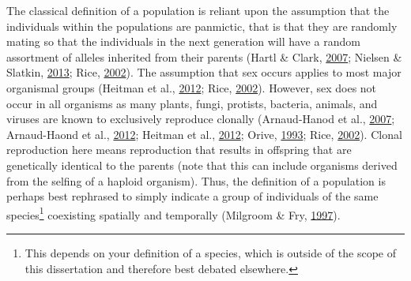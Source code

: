\documentclass[double,11pt]{beavtex}
\begin{document}
  The classical definition of a population is reliant upon the assumption
  that the individuals within the populations are panmictic, that is that
  they are randomly mating so that the individuals in the next generation
  will have a random assortment of alleles inherited from their parents
  (Hartl \& Clark, \protect\hyperlink{ref-hartl1997principles}{2007};
  Nielsen \& Slatkin,
  \protect\hyperlink{ref-nielsen2013introduction}{2013}; Rice,
  \protect\hyperlink{ref-rice2002evolution}{2002}). The assumption that
  sex occurs applies to most major organismal groups (Heitman et al.,
  \protect\hyperlink{ref-heitman2012evolution}{2012}; Rice,
  \protect\hyperlink{ref-rice2002evolution}{2002}). However, sex does not
  occur in all organisms as many plants, fungi, protists, bacteria,
  animals, and viruses are known to exclusively reproduce clonally
  (Arnaud-Hanod et al.,
  \protect\hyperlink{ref-arnaud2007standardizing}{2007}; Arnaud-Haond et
  al., \protect\hyperlink{ref-arnaud2012implications}{2012}; Heitman et
  al., \protect\hyperlink{ref-heitman2012evolution}{2012}; Orive,
  \protect\hyperlink{ref-orive1993effective}{1993}; Rice,
  \protect\hyperlink{ref-rice2002evolution}{2002}). Clonal reproduction
  here means reproduction that results in offspring that are genetically
  identical to the parents (note that this can include organisms derived
  from the selfing of a haploid organism). Thus, the definition of a
  population is perhaps best rephrased to simply indicate a group of
  individuals of the same species\footnote{This depends on your definition
    of a species, which is outside of the scope of this dissertation and
    therefore best debated elsewhere.} coexisting spatially and temporally
  (Milgroom \& Fry,
  \protect\hyperlink{ref-milgroom1997contributions}{1997}).
  
\end{document}
